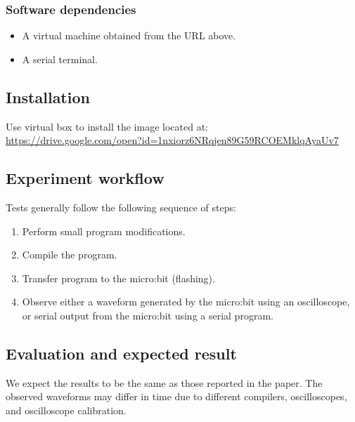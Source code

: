 {\subsubsection{Software dependencies}

\begin{itemize}
    \item A virtual machine obtained from the URL above.
    \item A serial terminal.

\end{itemize}

\subsection{Installation}

Use virtual box to install the image located at:\\[5pt]\url{https://drive.google.com/open?id=1nxiorz6NRqjen89G59RCOEMklqAyaUv7}
\subsection{Experiment workflow}

Tests generally follow the following sequence of steps:

\begin{enumerate}
    \item Perform small program modifications.
    \item Compile the program.
    \item Transfer program to the micro:bit (flashing).
    \item Observe either a waveform generated by the micro:bit using an oscilloscope, or serial output from the micro:bit using a serial program.
\end{enumerate}

\subsection{Evaluation and expected result}

We expect the results to be the same as those reported in the paper. The observed waveforms may differ in time due to different compilers, oscilloscopes, and oscilloscope calibration.

}
